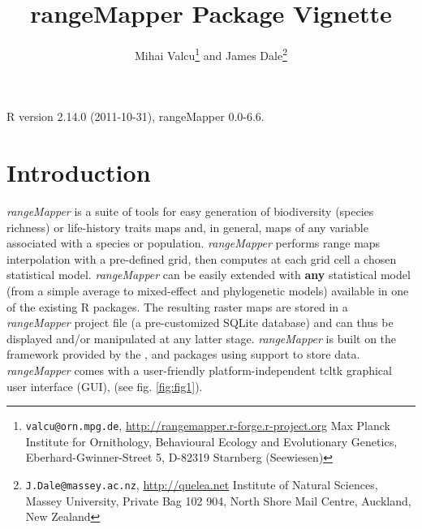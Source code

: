 \documentclass[ a4paper ]{article}
\begin{document}
\title{rangeMapper Package Vignette}
\author{
Mihai Valcu\footnote{
	\texttt{valcu@orn.mpg.de},
	\url{http://rangemapper.r-forge.r-project.org}
	Max Planck Institute for Ornithology, 
	Behavioural Ecology and Evolutionary Genetics, 
	Eberhard-Gwinner-Street 5, D-82319 Starnberg (Seewiesen)} and 
James Dale\footnote{
	\texttt{J.Dale@massey.ac.nz},
	\url{http://quelea.net}
	Institute of Natural Sciences,
	Massey University,
	Private Bag 102 904,
	North Shore Mail Centre,
	Auckland, New Zealand 
}
}

\maketitle
R version 2.14.0 (2011-10-31),
rangeMapper 0.0-6.6.


\section{Introduction}
	\emph{rangeMapper} is a suite of tools for easy generation of biodiversity (species richness) or life-history traits maps and, in general, maps of any variable associated with a species or population. 
	\emph{rangeMapper} performs range maps interpolation with a pre-defined grid, then computes at each grid cell a chosen statistical model. 
	\emph{rangeMapper} can be easily extended with {\bf any} statistical model (from a simple average to mixed-effect and phylogenetic models) available in one of the existing R packages.
	 The resulting raster maps are stored in a \emph{rangeMapper} project file (a pre-customized SQLite database) and 
	 can thus be displayed and/or manipulated at any latter stage.
	\emph{rangeMapper} is built on the framework provided by the \cite{sp}, \cite{maptools} and \cite{rgdal} packages using \cite{sqlite} support to store data.
	\emph{rangeMapper} comes with a user-friendly platform-independent tcltk graphical user interface (GUI), (see fig. \ref{fig:fig1}). 
\end{document}

